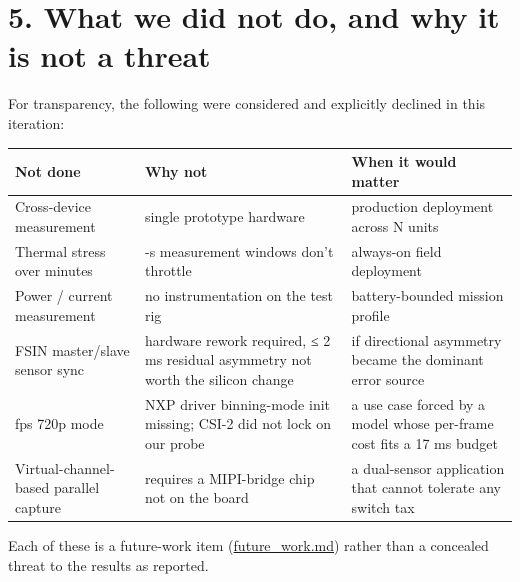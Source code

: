 \section{5. What we did not do, and why it is not a
threat}\label{what-we-did-not-do-and-why-it-is-not-a-threat}

For transparency, the following were considered and explicitly declined
in this iteration:

{\def\LTcaptype{none} %
\begin{longtable}[]{@{}
  >{\raggedright\arraybackslash}p{}
  >{\raggedright\arraybackslash}p{}
  >{\raggedright\arraybackslash}p{}@{}}
\toprule\noalign{}
\begin{minipage}[b]{\linewidth}\raggedright
Not done
\end{minipage} & \begin{minipage}[b]{\linewidth}\raggedright
Why not
\end{minipage} & \begin{minipage}[b]{\linewidth}\raggedright
When it would matter
\end{minipage} \\
\midrule\noalign{}
\endhead
\bottomrule\noalign{}
\endlastfoot
Cross-device measurement & single prototype hardware & production
deployment across N units \\
Thermal stress over minutes & 3-s measurement windows don't throttle &
always-on field deployment \\
Power / current measurement & no instrumentation on the test rig &
battery-bounded mission profile \\
FSIN master/slave sensor sync & hardware rework required, ≤ 2 ms
residual asymmetry not worth the silicon change & if directional
asymmetry became the dominant error source \\
60 fps 720p mode & NXP driver binning-mode init missing; CSI-2 did not
lock on our probe & a use case forced by a model whose per-frame cost
fits a 17 ms budget \\
Virtual-channel-based parallel capture & requires a MIPI-bridge chip not
on the board & a dual-sensor application that cannot tolerate any switch
tax \\
\end{longtable}
}

Each of these is a future-work item (\url{future_work.md}) rather than a
concealed threat to the results as reported.
